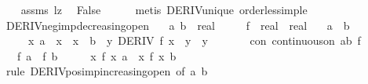 \begin{isabellebody}
\ \ \isamarkupfalse%
\ assms\ lz\ \isamarkupfalse%
\ False\isanewline
\ \ \ \ \isamarkupfalse%
\ {\isacharparenleft}{\kern0pt}metis\ DERIV{\isacharunderscore}{\kern0pt}unique\ order{\isacharunderscore}{\kern0pt}less{\isacharunderscore}{\kern0pt}imp{\isacharunderscore}{\kern0pt}le{\isacharparenright}{\kern0pt}\isanewline
{}\isamarkupfalse%
%
\endisatagproof
{\isafoldproof}%
%
\isadelimproof
\isanewline
%
\endisadelimproof
\isanewline
{}\isamarkupfalse%
\ DERIV{\isacharunderscore}{\kern0pt}neg{\isacharunderscore}{\kern0pt}imp{\isacharunderscore}{\kern0pt}decreasing{\isacharunderscore}{\kern0pt}open{\isacharcolon}{\kern0pt}\isanewline
\ \ \ a\ b\ {\isacharcolon}{\kern0pt}{\isacharcolon}{\kern0pt}\ real\isanewline
\ \ \ \ \ f\ {\isacharcolon}{\kern0pt}{\isacharcolon}{\kern0pt}\ {\isachardoublequoteopen}real\ {\isasymRightarrow}\ real{\isachardoublequoteclose}\isanewline
\ \ \ {\isachardoublequoteopen}a\ {\isacharless}{\kern0pt}\ b{\isachardoublequoteclose}\isanewline
\ \ \ \ \ {\isachardoublequoteopen}{\isasymAnd}x{\isachardot}{\kern0pt}\ a\ {\isacharless}{\kern0pt}\ x\ {\isasymLongrightarrow}\ x\ {\isacharless}{\kern0pt}\ b\ {\isasymLongrightarrow}\ {\isasymexists}y{\isachardot}{\kern0pt}\ DERIV\ f\ x\ {\isacharcolon}{\kern0pt}{\isachargreater}{\kern0pt}\ y\ {\isasymand}\ y\ {\isacharless}{\kern0pt}\ {}{\isachardoublequoteclose}\isanewline
\ \ \ \ \ con{\isacharcolon}{\kern0pt}\ {\isachardoublequoteopen}continuous{\isacharunderscore}{\kern0pt}on\ {\isacharbraceleft}{\kern0pt}a{\isachardot}{\kern0pt}{\isachardot}{\kern0pt}b{\isacharbraceright}{\kern0pt}\ f{\isachardoublequoteclose}\isanewline
\ \ \ {\isachardoublequoteopen}f\ a\ {\isachargreater}{\kern0pt}\ f\ b{\isachardoublequoteclose}\isanewline
%
\isadelimproof
%
\endisadelimproof
%
\isatagproof
{}\isamarkupfalse%
\ {\isacharminus}{\kern0pt}\isanewline
\ \ \isamarkupfalse%
\ {\isachardoublequoteopen}{\isacharparenleft}{\kern0pt}{\isasymlambda}x{\isachardot}{\kern0pt}\ {\isacharminus}{\kern0pt}f\ x{\isacharparenright}{\kern0pt}\ a\ {\isacharless}{\kern0pt}\ {\isacharparenleft}{\kern0pt}{\isasymlambda}x{\isachardot}{\kern0pt}\ {\isacharminus}{\kern0pt}f\ x{\isacharparenright}{\kern0pt}\ b{\isachardoublequoteclose}\isanewline
\ \ \isamarkupfalse%
\ {\isacharparenleft}{\kern0pt}rule\ DERIV{\isacharunderscore}{\kern0pt}pos{\isacharunderscore}{\kern0pt}imp{\isacharunderscore}{\kern0pt}increasing{\isacharunderscore}{\kern0pt}open\ {\isacharbrackleft}{\kern0pt}of\ a\ b{\isacharbrackright}{\kern0pt}{\isacharparenright}{\kern0pt}\isanewline

\end{isabellebody}
